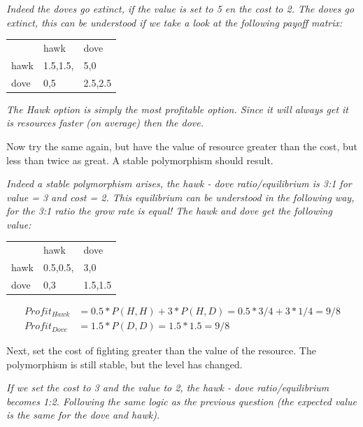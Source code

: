 \documentclass[a4paper]{article}
\begin{document}
\begin{enumerate}
\begin{enumerate}
\textit{Indeed the doves go extinct, if the value is set to 5 en the cost to 2. The doves go extinct, this can be understood if we take a look at the following payoff matrix:}

\begin{table}[h]
    \begin{center}
    	\begin{tabular}{lll}
    			 & hawk     & dove    \\
    		hawk & 1.5,1.5, & 5,0     \\
    		dove & 0,5      & 2.5,2.5
    	\end{tabular}
	\end{center}
\end{table}

\textit{The Hawk option is simply the most profitable option. Since it will always get it is resources faster (on average) then the dove.}

Now try the same again, but have the value of resource greater than the cost, but less than twice as great. A stable polymorphism should result.

\textit{Indeed a stable polymorphism arises, the hawk - dove ratio/equilibrium is 3:1 for value = 3 and cost = 2. This equilibrium can be understood in the following way, for the 3:1 ratio the grow rate is equal! The hawk and dove get the following value:}
\begin{table}[h]
    \begin{center}
    	\begin{tabular}{lll}
    			 & hawk     & dove    \\
    		hawk & 0.5,0.5, & 3,0     \\
    		dove & 0,3      & 1.5,1.5
    	\end{tabular}
    \end{center}
\end{table}
\begin{align}
	Profit_{Hawk} &= 0.5*P(H, H) + 3*P(H, D) = 0.5*3/4 + 3*1/4 = 9/8\\
	Profit_{Dove} &= 1.5*P(D, D) = 1.5*1.5 = 9/8
\end{align}

Next, set the cost of fighting greater than the value of the resource. The polymorphism is still stable, but the level has changed.

\textit{If we set the cost to 3 and the value to 2, the hawk - dove ratio/equilibrium becomes 1:2. Following the same logic as the previous question (the expected value is the same for the dove and hawk).}


\end{enumerate}
\end{enumerate}
\end{document}
